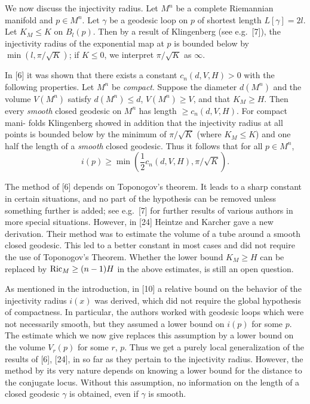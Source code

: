 We now discuss the injectivity radius. Let $M^n$ be a complete Riemannian
manifold and $p \in M^n$. Let $\gamma$ be a geodesic loop on $p$ of shortest
length $L[\gamma] = 2l$. Let $K_M \leq K$ on $B_l(p)$. Then by a result of
Klingenberg (see e.g.\ [7]), the injectivity radius of the exponential map at $p$
is bounded below by $\min(l, \pi/\sqrt{K})$; if $K \leq 0$, we interpret
$\pi/\sqrt{K}$ as $\infty$.

In [6] it was shown that there exists a constant $c_n(d, V, H) > 0$ with the
following properties. Let $M^n$ be \textit{compact}. Suppose the diameter
$d(M^n)$ and the volume $V(M^n)$ satisfy $d(M^n) \leq d$, $V(M^n) \geq V$, and
that $K_M \geq H$. Then every \textit{smooth} closed geodesic on $M^n$ has length
$\geq c_n(d, V, H)$. For compact mani- folds Klingenberg showed in addition that
the injectivity radius at all points is bounded below by the minimum of
$\pi/\sqrt{K}$ (where $K_M \leq K$) and one half the length of a \textit{smooth}
closed geodesic. Thus it follows that for all $p \in M^n$,
\begin{equation}
\tag{4.20}
i(p) \geq \min\left(\frac{1}{2} c_n(d, V, H), \pi/\sqrt{K}\right).
\end{equation}

The method of [6] depends on Toponogov's theorem. It leads to a sharp constant
in certain situations, and no part of the hypothesis can be removed unless
something further is added; see e.g.\ [7] for further results of various
authors in more special situations. However, in [24] Heintze and Karcher gave
a new derivation. Their method was to estimate the volume of a tube around a
smooth closed geodesic. This led to a better constant in most cases and did not
require the use of Toponogov's Theorem. Whether the lower bound
$K_M \geq H$ can be replaced by $\operatorname{Ric}_M \geq (n-1)H$ in the above estimates,
is still an open question.

As mentioned in the introduction, in [10] a relative bound on the behavior of
the injectivity radius $i(x)$ was derived, which did not require the global
hypothesis of compactness. In particular, the authors worked with geodesic
loops which were not necessarily smooth, but they assumed a lower bound on
$i(p)$ for some $p$. The estimate which we now give replaces this assumption by
a lower bound on the volume $V_r(p)$ for some $r$, $p$. Thus we get a purely
local generalization of the results of [6], [24], in so far as they pertain to
the injectivity radius. However, the method by its very nature depends on
knowing a lower bound for the distance to the conjugate locus. Without this
assumption, no information on the length of a closed geodesic $\gamma$ is
obtained, even if $\gamma$ is smooth.

